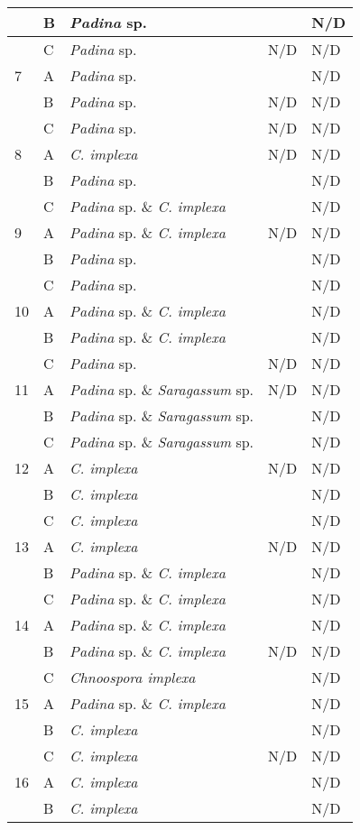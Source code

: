 \documentclass[12pt]{article}
\begin{document}
\begin{longtable}{ | p{1cm} | p{1cm} | p{3cm} | p{4cm} | p{4cm} | }
\hline
&B&\emph{Padina} sp.&&N/D\\
\hline
&C&\emph{Padina} sp.&N/D&N/D\\
\hline
7&A&\emph{Padina} sp.&&N/D\\
\hline
&B&\emph{Padina} sp.&N/D&N/D\\
\hline
&C&\emph{Padina} sp.&N/D&N/D\\
\hline
8&A&\emph{C. implexa}&N/D&N/D\\
\hline
&B&\emph{Padina} sp.&&N/D\\
\hline
&C&\emph{Padina} sp. \& \emph{C. implexa}&&N/D\\
\hline
9&A&\emph{Padina} sp. \& \emph{C. implexa}&N/D&N/D\\
\hline
&B&\emph{Padina} sp.&&N/D\\
\hline
&C&\emph{Padina} sp.&&N/D\\
\hline
10&A&\emph{Padina} sp. \& \emph{C. implexa}&&N/D\\
\hline
&B&\emph{Padina} sp. \& \emph{C. implexa}&&N/D\\
\hline
&C&\emph{Padina} sp.&N/D&N/D\\
\hline
11&A&\emph{Padina} sp. \& \emph{Saragassum} sp.&N/D&N/D\\
\hline
&B&\emph{Padina} sp. \& \emph{Saragassum} sp.&&N/D\\
\hline
&C&\emph{Padina} sp. \& \emph{Saragassum} sp.&&N/D\\
\hline
12&A&\emph{C. implexa}&N/D&N/D\\
\hline
&B&\emph{C. implexa}&&N/D\\
\hline
&C&\emph{C. implexa}&&N/D\\
\hline
13&A&\emph{C. implexa}&N/D&N/D\\
\hline
&B&\emph{Padina} sp. \& \emph{C. implexa}&&N/D\\
\hline
&C&\emph{Padina} sp. \& \emph{C. implexa}&&N/D\\
\hline
14&A&\emph{Padina} sp. \& \emph{C. implexa}&&N/D\\
\hline
&B&\emph{Padina} sp. \& \emph{C. implexa}&N/D&N/D\\
\hline
&C&\emph{Chnoospora implexa}&&N/D\\
\hline
15&A&\emph{Padina} sp. \& \emph{C. implexa}&&N/D\\
\hline
&B&\emph{C. implexa}&&N/D\\
\hline
&C&\emph{C. implexa}&N/D&N/D\\
\hline
16&A&\emph{C. implexa}&&N/D\\
\hline
&B&\emph{C. implexa}&&N/D\\

\end{longtable}
\end{document}
